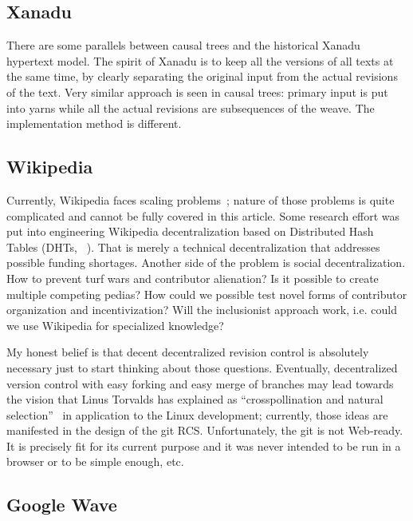 \documentclass{acm_proc_article-sp}
\begin{document}
\subsection{Xanadu}

There are some parallels between causal trees and the historical
Xanadu hypertext model. The spirit of Xanadu is to keep all the
versions of all texts at the same time, by clearly separating the
original input from the actual revisions of the text. Very similar 
approach is seen in causal trees: primary input is put into yarns
while all the actual revisions are subsequences of the weave.
The implementation method is different.

\subsection{Wikipedia}

Currently, Wikipedia faces scaling problems~\cite{no-singularity,wp-decay};
nature of those problems is quite complicated and cannot be fully
covered in this article. Some research effort was put into
engineering Wikipedia decentralization based on Distributed
Hash Tables (DHTs, ~\cite{urdaneta}). That is merely a
technical decentralization that addresses possible funding
shortages. Another side of the problem is social decentralization.
How to prevent turf wars and contributor alienation? Is it
possible to create multiple competing pedias? How could we
possible test novel forms of contributor organization and
incentivization? Will the inclusionist approach work, i.e.
could we use Wikipedia for specialized knowledge?

My honest belief is that decent decentralized revision control
is absolutely necessary just to start thinking about those
questions. Eventually, decentralized version control with
easy forking and easy merge of branches may lead towards the
vision that Linus Torvalds has explained as ``crosspollination
and natural selection''~\cite{linus-pollinates}
in application to the Linux development;
currently, those ideas are manifested in the design of the git RCS.
Unfortunately, the git is not Web-ready. It is precisely fit
for its current purpose and it was never intended to be run
in a browser or to be simple enough, etc.

\subsection{Google Wave}  \label{sec:waveot}
\end{document}
